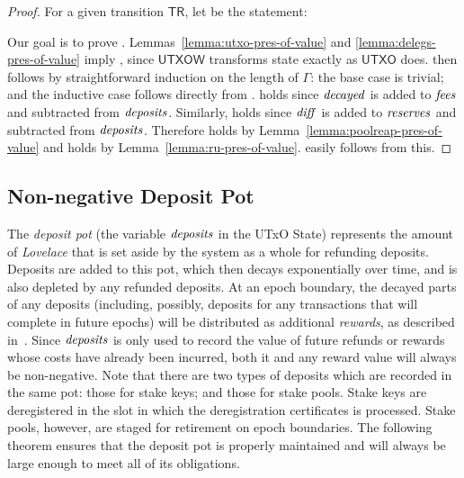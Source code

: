 \begin{proof}
  For a given transition $\mathsf{TR}$, let 
  be the statement:


  \noindent
  Our goal is to prove .
  Lemmas~\ref{lemma:utxo-pres-of-value} and \ref{lemma:delegs-pres-of-value} imply ,
  since $\mathsf{UTXOW}$ transforms state exactly as $\mathsf{UTXO}$ does.
   then follows by straightforward induction on the length of $\Gamma$:
  the base case is trivial;
  and the inductive case follows directly from .
%
   holds since $\mathit{decayed}$ is added to $\mathit{fees}$
  and subtracted from $\mathit{deposits}$.
  Similarly,  holds since $\mathit{diff}$ is added to $\mathit{reserves}$
  and subtracted from $\mathit{deposits}$.
  Therefore  holds by Lemma~\ref{lemma:poolreap-pres-of-value}
  and  holds by Lemma~\ref{lemma:ru-pres-of-value}.
   easily follows from this.
\end{proof}

\subsection{Non-negative Deposit Pot}
\label{sec:non-negative-deposit-pot}

The \emph{deposit pot} (the variable $\mathit{deposits}$ in the UTxO State)
represents the amount of \emph{Lovelace} that is set aside by the system as a whole for refunding deposits.
Deposits are added to this pot, which then decays exponentially over time,
and is also depleted by any refunded deposits.
At an epoch boundary, the decayed parts of any deposits (including, possibly, deposits for any transactions that will complete in future epochs)
will be distributed as additional \emph{rewards}, as described in~\cite{delegation_design}.
Since $\mathit{deposits}$ is only used to record the value of future refunds or rewards whose costs have
already been incurred, both it and any reward value will always be non-negative.
Note that there are two types of deposits which are recorded in the same pot: those for stake keys; and those for stake pools.
Stake keys are deregistered in the slot in which the deregistration certificates
is processed. Stake pools, however, are staged for retirement on epoch boundaries.
%
The following theorem ensures that the deposit pot is properly maintained
and will always be large enough to meet all of its obligations.


